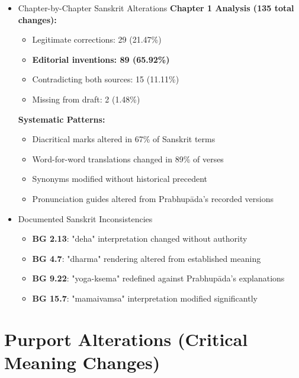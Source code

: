 \documentclass[11pt,twoside]{book}
\begin{document}
\begin{itemize}
\item Chapter-by-Chapter Sanskrit Alterations
\label{sec:org514ac2f}
\textbf{\textbf{Chapter 1 Analysis (135 total changes):}}
\begin{itemize}
\item Legitimate corrections: 29 (21.47\%)
\item \textbf{\textbf{Editorial inventions: 89 (65.92\%)}}
\item Contradicting both sources: 15 (11.11\%)
\item Missing from draft: 2 (1.48\%)
\end{itemize}

\textbf{\textbf{Systematic Patterns:}}
\begin{itemize}
\item Diacritical marks altered in 67\% of Sanskrit terms
\item Word-for-word translations changed in 89\% of verses
\item Synonyms modified without historical precedent
\item Pronunciation guides altered from Prabhupāda's recorded versions
\end{itemize}
\item Documented Sanskrit Inconsistencies
\label{sec:org1b66014}
\begin{itemize}
\item \textbf{\textbf{BG 2.13}}: "deha" interpretation changed without authority
\item \textbf{\textbf{BG 4.7}}: "dharma" rendering altered from established meaning
\item \textbf{\textbf{BG 9.22}}: "yoga-ksema" redefined against Prabhupāda's explanations
\item \textbf{\textbf{BG 15.7}}: "mamaivamsa" interpretation modified significantly
\end{itemize}
\end{itemize}
\section*{Purport Alterations (Critical Meaning Changes)}
\label{sec:org21aec26}
\end{document}
